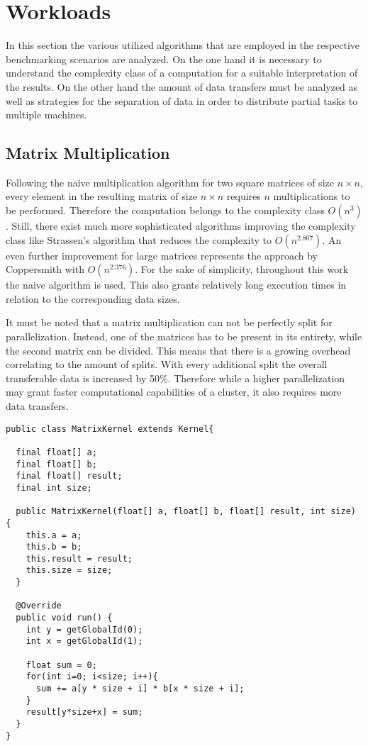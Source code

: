 \section{Workloads}
\label{workload_explanation}
In this section the various utilized algorithms that are employed in the respective benchmarking scenarios are analyzed. On the one hand it is necessary to understand the complexity class of a computation for a suitable interpretation of the results. On the other hand the amount of data transfers must be analyzed as well as strategies for the separation of data in order to distribute partial tasks to multiple machines.

\subsection*{Matrix Multiplication}
\label{matrix_multiplication_workload}
Following the naive multiplication algorithm for two square matrices of size $n\times n$, every element in the resulting matrix of size $n\times n$ requires $n$ multiplications to be performed. Therefore the computation belongs to the complexity class $O(n^3)$. Still, there exist much more sophisticated algorithms improving the complexity class like Strassen's algorithm that reduces the complexity to $O(n^{2.807})$\cite{strassen}. An even further improvement for large matrices represents the approach by Coppersmith with $O(n^{2.376})$\cite{coppersmith}. For the sake of simplicity, throughout this work the naive algorithm is used. This also grants relatively long execution times in relation to the corresponding data sizes.

It must be noted that a matrix multiplication can not be perfectly split for parallelization. Instead, one of the matrices has to be present in its entirety, while the second matrix can be divided. This means that there is a growing overhead correlating to the amount of splits. With every additional split the overall transferable data is increased by 50\%. Therefore while a higher parallelization may grant faster computational capabilities of a cluster, it also requires more data transfers.

\begin{lstlisting}[caption=Aparapi Matrix Multiplication,captionpos=b,label=lst:aparapi_matrix_multiplication]
public class MatrixKernel extends Kernel{

  final float[] a;
  final float[] b;
  final float[] result;
  final int size;

  public MatrixKernel(float[] a, float[] b, float[] result, int size) {
    this.a = a;
    this.b = b;
    this.result = result;
    this.size = size;
  }

  @Override
  public void run() {
    int y = getGlobalId(0);
    int x = getGlobalId(1);

    float sum = 0;
    for(int i=0; i<size; i++){
      sum += a[y * size + i] * b[x * size + i];
    }
    result[y*size+x] = sum;
  }
}
\end{lstlisting}

